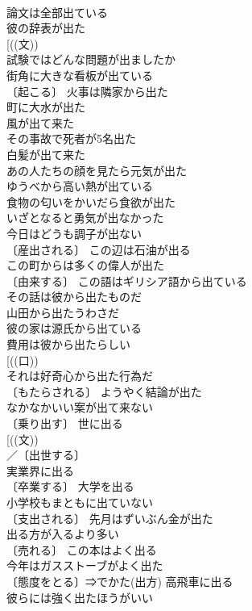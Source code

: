 \documentclass[8pt]{extreport}
\begin{document}
\begin{CJK}{UTF8}{min}
\\	論文は全部出ている 
\\	彼の辞表が出た 
\\	[((文))
\\	試験ではどんな問題が出ましたか 
\\	街角に大きな看板が出ている 
\\	〔起こる〕 火事は隣家から出た 
\\	町に大水が出た 
\\	風が出て来た 
\\	その事故で死者が5名出た 
\\	白髪が出て来た 
\\	あの人たちの顔を見たら元気が出た 
\\	ゆうべから高い熱が出ている 
\\	食物の匂いをかいだら食欲が出た 
\\	いざとなると勇気が出なかった 
\\	今日はどうも調子が出ない 
\\	〔産出される〕 この辺は石油が出る 
\\	この町からは多くの偉人が出た 
\\	〔由来する〕 この語はギリシア語から出ている 
\\	その話は彼から出たものだ 
\\	山田から出たうわさだ 
\\	彼の家は源氏から出ている 
\\	費用は彼から出たらしい 
\\	[((口))
\\	それは好奇心から出た行為だ 
\\	〔もたらされる〕 ようやく結論が出た 
\\	なかなかいい案が出て来ない 
\\	〔乗り出す〕 世に出る 
\\	[((文))
\\	／〔出世する〕
\\	実業界に出る 
\\	〔卒業する〕 大学を出る 
\\	小学校もまともに出ていない 
\\	〔支出される〕 先月はずいぶん金が出た 
\\	出る方が入るより多い 
\\	〔売れる〕 この本はよく出る 
\\	今年はガスストーブがよく出た 
\\	〔態度をとる〕⇒でかた(出方) 高飛車に出る 
\\	彼らには強く出たほうがいい 

\end{CJK}
\end{document}
